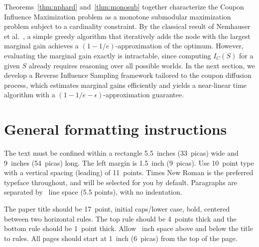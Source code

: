\documentclass{article}
\begin{document}
Theorems~\ref{thm:nphard} and~\ref{thm:monosub} together characterize the Coupon Influence Maximization problem as a monotone submodular maximization problem subject to a cardinality constraint. By the classical result of Nemhauser et al.~\cite{nemhauser1978analysis}, a simple greedy algorithm that iteratively adds the node with the largest marginal gain achieves a $(1 - 1/e)$-approximation of the optimum. However, evaluating the marginal gain exactly is intractable, since computing $I_C(S)$ for a given $S$ already requires reasoning over all possible worlds. In the next section, we develop a Reverse Influence Sampling framework tailored to the coupon diffusion process, which estimates marginal gains efficiently and yields a near-linear time algorithm with a $(1 - 1/e - \epsilon)$-approximation guarantee.








































\section{General formatting instructions}
\label{gen_inst}


The text must be confined within a rectangle 5.5~inches (33~picas) wide and
9~inches (54~picas) long. The left margin is 1.5~inch (9~picas).  Use 10~point
type with a vertical spacing (leading) of 11~points.  Times New Roman is the
preferred typeface throughout, and will be selected for you by default.
Paragraphs are separated by ~line space (5.5 points), with no
indentation.


The paper title should be 17~point, initial caps/lower case, bold, centered
between two horizontal rules. The top rule should be 4~points thick and the
bottom rule should be 1~point thick. Allow ~inch space above and
below the title to rules. All pages should start at 1~inch (6~picas) from the
top of the page.
\end{document}
